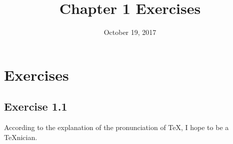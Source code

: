 \documentclass{article}
\title {Chapter 1 Exercises}
\date {October 19, 2017}
\begin{document}
\maketitle
{}

\section*{Exercises}
\subsection*{Exercise 1.1}
According to the explanation of the pronunciation of \TeX, I hope to be a \TeX nician.
\end{document}
